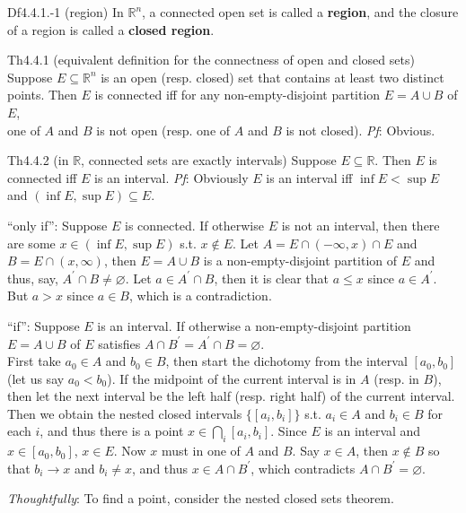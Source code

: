 \documentclass{article}
\begin{document}
\begin{Df}{Df4.4.1.-1 (region)}
    In $\mathbb{R}^n$, a connected open set is called a \textbf{region}, and the closure of a region is called a \textbf{closed region}.
\end{Df}

\begin{Th}{Th4.4.1 (equivalent definition for the connectness of open and closed sets)}
    Suppose $E\subseteq\mathbb{R}^n$ is an open (resp. closed) set that contains at least two distinct points. Then $E$ is connected iff for any non-empty-disjoint partition $E = A\cup B$ of $E$, \\
    one of $A$ and $B$ is not open (resp. one of $A$ and $B$ is not closed).
    \tcblower
    \textit{Pf}: Obvious.
\end{Th}

\begin{Th}{Th4.4.2 (in $\mathbb{R}$, connected sets are exactly intervals)}
    Suppose $E\subseteq\mathbb{R}$. Then $E$ is connected iff $E$ is an interval.
    \tcblower
    \textit{Pf}: Obviously \textcolor{Th}{$E$ is an interval iff $\inf E<\sup E$ and $(\inf E, \sup E)\subseteq E$}.
    \begin{compactenum}
        \item ``only if'': Suppose $E$ is connected. If otherwise $E$ is not an interval, then there are some $x\in (\inf E, \sup E)$ s.t. $x\notin E$. Let $A = E\cap (-\infty, x)\cap E$ and $B = E\cap (x, \infty)$, then $E = A\cup B$ is a non-empty-disjoint partition of $E$ and thus, say, $A^\prime\cap B\neq\varnothing$. Let $a\in A^\prime\cap B$, then it is clear that $a\leq x$ since $a\in A^\prime$. But $a>x$ since $a\in B$, which is a contradiction.
        \item ``if'': Suppose $E$ is an interval. If otherwise a non-empty-disjoint partition $E = A\cup B$ of $E$ satisfies $A\cap B^\prime = A^\prime\cap B = \varnothing$. \\ 
        First take $a_0\in A$ and $b_0\in B$, then start the dichotomy from the interval $[a_0, b_0]$ (let us say $a_0<b_0$). If the midpoint of the current interval is in $A$ (resp. in $B$), then let the next interval be the left half (resp. right half) of the current interval. Then we obtain the nested closed intervals $\{[a_i, b_i]\}$ s.t. $a_i\in A$ and $b_i\in B$ for each $i$, and thus there is a point $x\in\bigcap_i [a_i, b_i]$. Since $E$ is an interval and $x\in [a_0, b_0]$, $x\in E$. Now $x$ must in one of $A$ and $B$. Say $x\in A$, then $x\notin B$ so that $b_i\rightarrow x$ and $b_i\neq x$, and thus $x\in A\cap B^\prime$, which contradicts $A\cap B^\prime = \varnothing$.
    \end{compactenum}
    \textcolor{P}{\textit{Thoughtfully}: To find a point, consider the nested closed sets theorem.}
\end{Th}
\end{document}
